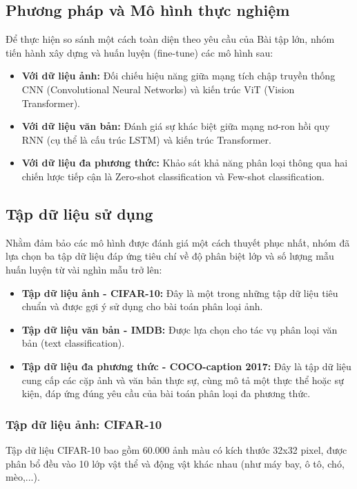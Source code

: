 \documentclass[a4paper]{article}
\theoremstyle{definition}
\begin{document}
\subsection{Phương pháp và Mô hình thực nghiệm}
Để thực hiện so sánh một cách toàn diện theo yêu cầu của Bài tập lớn, nhóm tiến hành xây dựng và huấn luyện (fine-tune) các mô hình sau:
\begin{itemize}
	\item \textbf{Với dữ liệu ảnh:} Đối chiếu hiệu năng giữa mạng tích chập truyền thống CNN (Convolutional Neural Networks) và kiến trúc ViT (Vision Transformer).
	\item \textbf{Với dữ liệu văn bản:} Đánh giá sự khác biệt giữa mạng nơ-ron hồi quy RNN (cụ thể là cấu trúc LSTM) và kiến trúc Transformer.
	\item \textbf{Với dữ liệu đa phương thức:} Khảo sát khả năng phân loại thông qua hai chiến lược tiếp cận là Zero-shot classification và Few-shot classification.
\end{itemize}

\subsection{Tập dữ liệu sử dụng}
Nhằm đảm bảo các mô hình được đánh giá một cách thuyết phục nhất, nhóm đã lựa chọn ba tập dữ liệu đáp ứng tiêu chí về độ phân biệt lớp và số lượng mẫu huấn luyện từ vài nghìn mẫu trở lên:
\begin{itemize}
	\item \textbf{Tập dữ liệu ảnh - CIFAR-10:} Đây là một trong những tập dữ liệu tiêu chuẩn và được gợi ý sử dụng cho bài toán phân loại ảnh.
	\item \textbf{Tập dữ liệu văn bản - IMDB:} Được lựa chọn cho tác vụ phân loại văn bản (text classification). \\
	\item \textbf{Tập dữ liệu đa phương thức - COCO-caption 2017:} Đây là tập dữ liệu cung cấp các cặp ảnh và văn bản thực sự, cùng mô tả một thực thể hoặc sự kiện, đáp ứng đúng yêu cầu của bài toán phân loại đa phương thức.
\end{itemize}
\subsubsection{Tập dữ liệu ảnh: CIFAR-10}
Tập dữ liệu CIFAR-10 bao gồm 60.000 ảnh màu có kích thước 32x32 pixel, được phân bổ đều vào 10 lớp vật thể và động vật khác nhau (như máy bay, ô tô, chó, mèo,...).
\end{document}
